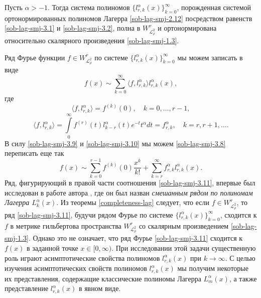 \begin{theorem}\label{completeness-lag}
Пусть $\alpha>-1$. Тогда система полиномов $\{l_{r,k}^{\alpha}(x)\}_{k=0}^\infty$, порожденная системой ортонормированных полиномов Лагерра \eqref{sob-lag-smj-2.12} посредством равенств \eqref{sob-lag-smj-3.1} и \eqref{sob-lag-smj-3.2}, полна  в $W^r_{\mathcal{L}^2_\rho}$ и ортонормирована относительно скалярного произведения \eqref{sob-lag-smj-1.3}.
\end{theorem}

Ряд Фурье функции $f\in W^r_{\mathcal{L}^2_\rho}$ по системе $\{l_{r,k}^{\alpha}(x)\}_{k=0}^\infty$
мы можем записать в виде
\begin{equation}\label{sob-lag-smj-3.8}
f(x)\sim  \sum_{k=0}^\infty \langle f,l_{r,k}^\alpha \rangle  l_{r,k}^\alpha(x),
\end{equation}
где
\begin{equation}\label{sob-lag-smj-3.9}
\langle f,l_{r,k}^\alpha \rangle = f^{(k)}(0),\quad k=0,\ldots, r-1,
\end{equation}
\begin{equation}\label{sob-lag-smj-3.10}
\langle f,l_{r,k}^\alpha \rangle = \int\limits_0^\infty f^{(r)}(t) l_{k-r}^\alpha(t)e^{-t}t^\alpha dt=f_{r,k}^\alpha,\quad k=r,r+1,\ldots.
     \end{equation}
В силу \eqref{sob-lag-smj-3.9}  и \eqref{sob-lag-smj-3.10} мы можем \eqref{sob-lag-smj-3.8} переписать еще так
\begin{equation}\label{sob-lag-smj-3.11}
f(x)\sim \sum_{k=0}^{r-1} f^{(k)}(0)\frac{x^k}{k!}+ \sum_{k=r}^\infty f_{r,k}^\alpha l_{r,k}^\alpha(x).
\end{equation}
Ряд, фигурирующий в правой части соотношения \eqref{sob-lag-smj-3.11}, впервые был исследован в работе автора \cite{Haar-Tcheb-Shar13}, где он был назван \textit{смешанным рядом по полиномам Лагерра $L_{k}^\alpha(x)$}. Из теоремы \ref{completeness-lag} следует, что если   $f\in W^r_{\mathcal{L}^2_\rho}$, то ряд \eqref{sob-lag-smj-3.11}, будучи  рядом Фурье  по системе $\{l_{r,k}^{\alpha}(x)\}_{k=0}^\infty$, сходится к $f$ в метрике гильбертова пространства $W^r_{\mathcal{L}^2_\rho}$ со скалярным произведением \eqref{sob-lag-smj-1.3}.
Однако это не означает, что ряд Фурье \eqref{sob-lag-smj-3.11} сходится к $f(x)$ в заданной точке $x\in[0,\infty)$.  При исследовании этой задачи существенную роль играют асимптотические свойства полиномов $l_{r,k}^{\alpha}(x)$ при $k\to\infty$. С целью изучения асимптотических свойств  полиномов $l_{r,k}^{\alpha}(x)$ мы получим некоторые их представления, содержащие   классические полиномы Лагерра $L_{m}^{\alpha}(x)$, а также представление $l_{r,k}^{\alpha}(x)$  в явном виде.


